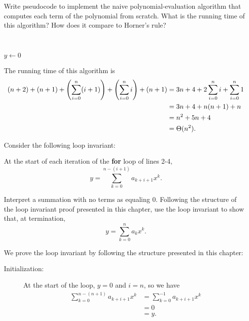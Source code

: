 \documentclass[Chapter02]{subfiles}
\begin{document}
\begin{problems}
\begin{problems}
			\item Write pseudocode to implement the naive polynomial-evaluation algorithm that computes each term of the polynomial from scratch. What is the running time of this algorithm? How does it compare to Horner's rule?
			\begin{answer}
				\hfill\\
				\begin{algorithm}[H]
					$y \leftarrow 0$\;
				\end{algorithm}

				The running time of this algorithm is
				\begin{align*}
					(n + 2) + (n + 1) + \qty(\sum_{i = 0}^n (i + 1)) + \qty(\sum_{i = 0}^n i) + (n + 1) &= 3n + 4 + 2\sum_{i = 0}^n i + \sum_{i = 0}^n 1\\
						&= 3n + 4 + n(n + 1) + n\\
						&= n^2 + 5n + 4\\
						&= \Theta(n^2).
				\end{align*}
			\end{answer}
			
			\item Consider the following loop invariant: \label{exer:ch02-polynomial-loop-invariant}
			\begin{addmargin}[2em]{2em}
				At the start of each iteration of the \textbf{for} loop of lines 2-4,
				\[
					y = \sum_{k = 0}^{n - (i + 1)} a_{k + i + 1}x^k.
				\]
			\end{addmargin}
			Interpret a summation with no terms as equaling 0. Following the structure of the loop invariant proof presented in this chapter, use the loop invariant to show that, at termination,
			\[
				y = \sum_{k = 0}^n a_kx^k.
			\]
			\begin{answer}
				We prove the loop invariant by following the structure presented in this chapter:
				\begin{description}
					\item[Initialization:] At the start of the loop, $y = 0$ and $i = n$, so we have
					\begin{align*}
						\sum_{k = 0}^{n - (n + 1)} a_{k + i + 1} x^k &= \sum_{k = 0}^{-1} a_{k + i + 1} x^k\\
							&= 0\\
							&= y.
					\end{align*}


\end{description}
\end{answer}
\end{problems}
\end{problems}
\end{document}
